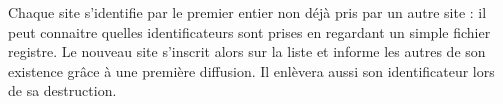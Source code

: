 Chaque site s'identifie par le premier entier non déjà pris par un autre site : il peut connaitre quelles identificateurs sont prises en regardant un simple fichier registre. Le nouveau site s'inscrit alors sur la liste et informe les autres de son existence grâce à une première diffusion. Il enlèvera aussi son identificateur lors de sa destruction.


